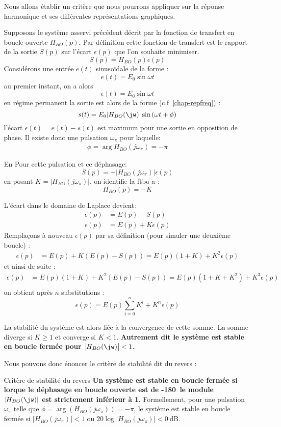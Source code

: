 Nous allons établir un critère que nous pourrons appliquer sur la réponse 
harmonique et ses différentes représentations graphiques.

Supposons le système asservi précédent décrit par la fonction de transfert 
en boucle ouverte $H_{BO}(p)$. Par définition cette fonction de transfert 
est le rapport de la sortie $S(p)$ sur l'écart $\epsilon(p)$ que l'on 
souhaite minimiser.
$$
S(p)=H_{BO}(p)\epsilon(p)
$$
Considérons une entrée $e(t)$ sinuso\"idale de la forme :
$$
e(t)=E_0\sin{\omega t}
$$
au premier instant, on a alors 
$$
\epsilon(t)=E_0\sin{\omega t}
$$
en régime permanent la sortie est alors de la forme (c.f~\cref{chap-repfreq}) :
$$
s(t)=E_0|H_{BO}(\jw)|\sin{(\omega t+\phi)}
$$
l'écart $\epsilon(t)=e(t)-s(t)$ est maximum pour une sortie en opposition 
de phase. Il existe donc une pulsation $\omega_\pi$ pour laquelle:
\begin{align*}
    \phi=\arg{H_{BO}(j\omega_\pi)}=-\pi
\end{align*}

En Pour cette pulsation et ce déphasage: 
$$
S(p)=-\big|H_{BO}(j\omega_\pi)\big|\epsilon(p)
$$
en posant $K=|H_{BO}(j\omega_\pi)|$, on identifie la \gls{ftbo} a :
$$
H_{BO}(p)=-K
$$

L'écart dans le domaine de Laplace devient:
\begin{align*}
    \epsilon(p)&=E(p)-S(p)\\
    \epsilon(p)&=E(p)+K\epsilon(p)
\end{align*}
Remplaçons à nouveau $\epsilon(p)$ par sa définition (pour simuler une 
deuxième boucle) : 
\begin{align*}
    \epsilon(p)&=E(p)+K(E(p)-S(p))=E(p)(1+K)+K^2\epsilon(p)
\end{align*}
et ainsi de suite :
\begin{align*}
    \epsilon(p)&=E(p)(1+K)+K^2\left(E(p)-S(p)\right)
                =E(p)(1+K+K^2)+K^3\epsilon(p)\\
\end{align*}
on obtient après $n$ substitutions :
$$
\epsilon(p)=E(p)\sum_{i=0}^{n}K^i+K^n\epsilon(p)
$$

La stabilité du système est alors liée à la convergence de cette somme.
La somme diverge si $K\geq1$ et converge si $K<1$. 
\textbf{Autrement dit le système est stable en boucle fermée 
pour $\big|H_{BO}(\jw)\big|<1$.}

Nous pouvons donc énoncer le critère de stabilité dit du revers :

\begin{criteria}{Critère de stabilité du revers}
    \textbf{Un système est stable en boucle fermée si lorque le 
    déphasage en boucle ouverte est de -180\degree~le module $|H_{BO}(\jw)|$ 
    est strictement inférieur à 1.}
    Formellement, pour une pulsation $\omega_{\pi}$ telle que 
    $\phi=\arg{\left(H_{BO}(j\omega_\pi)\right)}=-\pi$, 
    le système est stable en boucle fermée si $|H_{BO}(j\omega_\pi)|<1$ ou 
    $20\log{|H_{BO}(j\omega_\pi)|}<\SI{0}{\dB}$.
\end{criteria}

